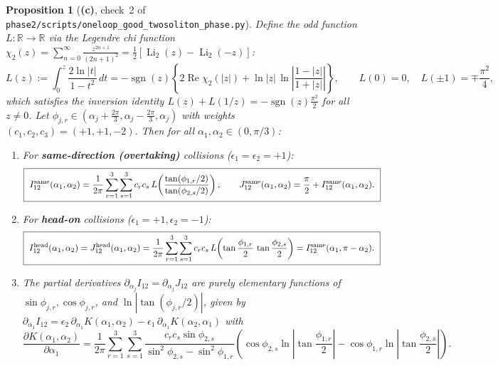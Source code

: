 \documentclass[11pt,a4paper]{article}
\newcommand{\Lc}{\textsf{\textbf{(c)}}}
\newcommand{\script}[1]{\texttt{phase2/\allowbreak scripts/\allowbreak #1}}
\newtheorem{proposition}{Proposition}[section]
\theoremstyle{remark}
\begin{document}
\begin{proposition}[\Lc, check~2 of \script{oneloop\_good\_twosoliton\_phase.py}]\label{prop:closed_dilog}
Define the odd function $L:\mathbb{R}\to\mathbb{R}$ via the Legendre chi function $\chi_2(z)=\sum_{n=0}^\infty\frac{z^{2n+1}}{(2n+1)^2}=\tfrac12[\operatorname{Li}_2(z)-\operatorname{Li}_2(-z)]$:
\begin{equation}\label{eq:L_chi2}
L(z):=\int_0^z\frac{2\ln|t|}{1-t^2}\,dt=-\operatorname{sgn}(z)\left\{2\operatorname{Re}\chi_2(|z|)+\ln|z|\,\ln\left|\frac{1-|z|}{1+|z|}\right|\right\},
\qquad L(0)=0,\quad L(\pm 1)=\mp\frac{\pi^2}{4},
\end{equation}
which satisfies the inversion identity $L(z)+L(1/z)=-\operatorname{sgn}(z)\frac{\pi^2}{2}$ for all $z\neq 0$. Let $\phi_{j,r}\in(\alpha_j+\frac{2\pi}{3},\alpha_j-\frac{2\pi}{3},\alpha_j)$ with weights $(c_1,c_2,c_3)=(+1,+1,-2)$. Then for all $\alpha_1,\alpha_2\in(0,\pi/3)$:
\begin{enumerate}
\item For \textbf{same-direction (overtaking)} collisions ($\epsilon_1=\epsilon_2=+1$):
\begin{equation}\label{eq:I_J_same_closed}
\boxed{\ I_{12}^{\rm same}(\alpha_1,\alpha_2)=\frac{1}{2\pi}\sum_{r=1}^3\sum_{s=1}^3 c_r c_s\,L\!\left(\frac{\tan(\phi_{1,r}/2)}{\tan(\phi_{2,s}/2)}\right),\qquad
J_{12}^{\rm same}(\alpha_1,\alpha_2)=\frac{\pi}{2}+I_{12}^{\rm same}(\alpha_1,\alpha_2).\ }
\end{equation}
\item For \textbf{head-on} collisions ($\epsilon_1=+1,\epsilon_2=-1$):
\begin{equation}\label{eq:I_J_head_closed}
\boxed{\ I_{12}^{\rm head}(\alpha_1,\alpha_2)=J_{12}^{\rm head}(\alpha_1,\alpha_2)
=\frac{1}{2\pi}\sum_{r=1}^3\sum_{s=1}^3 c_r c_s\,L\!\left(\tan\frac{\phi_{1,r}}{2}\,\tan\frac{\phi_{2,s}}{2}\right)
=I_{12}^{\rm same}(\alpha_1,\pi-\alpha_2).\ }
\end{equation}
\item The partial derivatives $\partial_{\alpha_j}I_{12}=\partial_{\alpha_j}J_{12}$ are purely elementary functions of $\sin\phi_{j,r},\cos\phi_{j,r}$, and $\ln|\tan(\phi_{j,r}/2)|$, given by $\partial_{\alpha_1}I_{12}=\epsilon_2\,\partial_{\alpha_1}K(\alpha_1,\alpha_2)-\epsilon_1\,\partial_{\alpha_1}K(\alpha_2,\alpha_1)$ with
\begin{equation}\label{eq:dK_elem}
\frac{\partial K(\alpha_1,\alpha_2)}{\partial\alpha_1}
=\frac{1}{2\pi}\sum_{r=1}^3\sum_{s=1}^3\frac{c_r c_s\sin\phi_{2,s}}{\sin^2\phi_{2,s}-\sin^2\phi_{1,r}}
\left(\cos\phi_{2,s}\ln\left|\tan\frac{\phi_{1,r}}{2}\right|-\cos\phi_{1,r}\ln\left|\tan\frac{\phi_{2,s}}{2}\right|\right).
\end{equation}
\end{enumerate}
\end{proposition}
\end{document}
